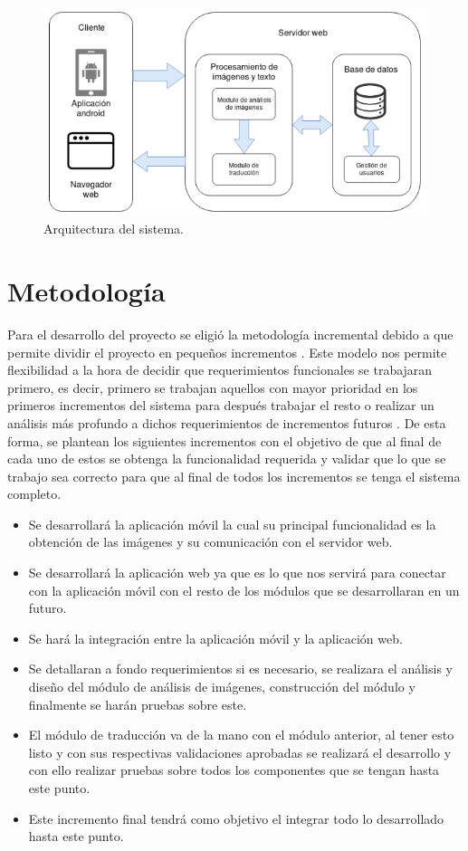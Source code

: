 \begin{figure}[h]
\centering
\includegraphics[width=1.0\textwidth]{capitulo1/images/arquitectura.png}
\caption{Arquitectura del sistema.}
\label{fig:arquitecturaInicial}
\end{figure}
\newpage

\section{Metodología} Para el desarrollo del proyecto se eligió la metodología incremental debido a que permite dividir el proyecto en pequeños incrementos \cite{iterativeDevelopment}. Este modelo nos permite flexibilidad a la hora de decidir que requerimientos funcionales se trabajaran primero, es decir, primero se trabajan aquellos con mayor prioridad en los primeros incrementos del sistema para después trabajar el resto o realizar un análisis más profundo a dichos requerimientos de incrementos futuros \cite{sommerville}. De esta forma, se plantean los siguientes incrementos con el objetivo de que al final de cada uno de estos se obtenga la funcionalidad requerida y validar que lo que se trabajo sea correcto para que al final de todos los incrementos se tenga el sistema completo.
\begin{itemize}
	\item Se desarrollará la aplicación móvil la cual su principal funcionalidad es la obtención de las imágenes y su comunicación con el servidor web.
	\item Se desarrollará la aplicación web ya que es lo que nos servirá para conectar con la aplicación móvil con el resto de los módulos que se desarrollaran en un futuro.
	\item Se hará la integración entre la aplicación móvil y la aplicación web.
    \item Se detallaran a fondo requerimientos si es necesario, se realizara el análisis y diseño del módulo de análisis de imágenes, construcción del módulo y finalmente se harán pruebas sobre este.
    \item El módulo de traducción va de la mano con el módulo anterior, al tener esto listo y con sus respectivas validaciones aprobadas se realizará el desarrollo y con ello realizar pruebas sobre todos los componentes que se tengan hasta este punto.
    \item Este incremento final tendrá como objetivo el integrar todo lo desarrollado hasta este punto.
\end{itemize}




